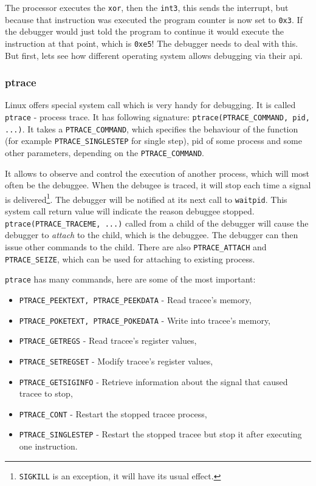 \begin{itemize}
The processor executes the \lstinline{xor}, then the \lstinline{int3}, this sends the interrupt, but because that instruction was executed the program counter is now set to \lstinline{0x3}. If the debugger would just told the program to continue it would execute the instruction at that point, which is \lstinline{0xe5}! The debugger needs to deal with this. But first, lets see how different operating system allows debugging via their api.

\subsubsection{ptrace}
Linux offers special system call which is very handy for debugging. It is called \lstinline{ptrace} \cite{ptrace} - process trace. It has following signature: \lstinline{ptrace(PTRACE_COMMAND, pid, ...)}. It takes a \lstinline{PTRACE_COMMAND}, which specifies the behaviour of the function (for example \lstinline{PTRACE_SINGLESTEP} for single step), pid of some process and some other parameters, depending on the \lstinline{PTRACE_COMMAND}. 

It allows to observe and control the execution of another process, which will most often be the debuggee. When the debugee is traced, it will stop each time a signal is delivered\footnote{\lstinline{SIGKILL} is an exception, it will have its usual effect.}. The debugger will be notified at its next call to \lstinline{waitpid}. This system call return value will indicate the reason debuggee stopped. \lstinline{ptrace(PTRACE_TRACEME, ...)} called from a child of the debugger will cause the debugger to \textit{attach} to the child, which is the debuggee. The debugger can then issue other commands to the child. There are also \lstinline{PTRACE_ATTACH} and \lstinline{PTRACE_SEIZE}, which can be used for attaching to existing process.

\lstinline{ptrace} has many commands, here are some of the most important:
\begin{itemize}
    \item \lstinline{PTRACE_PEEKTEXT, PTRACE_PEEKDATA} - Read tracee's memory,
    \item \lstinline{PTRACE_POKETEXT, PTRACE_POKEDATA} - Write into tracee's memory,
    \item \lstinline{PTRACE_GETREGS} - Read tracee's register values,
    \item \lstinline{PTRACE_SETREGSET} - Modify tracee's register values,
    \item \lstinline{PTRACE_GETSIGINFO} - Retrieve information about the signal that caused tracee to stop,
    \item \lstinline{PTRACE_CONT} - Restart the stopped tracee process,
    \item \lstinline{PTRACE_SINGLESTEP} - Restart the stopped tracee but stop it after executing one instruction.
\end{itemize}


\end{itemize}

